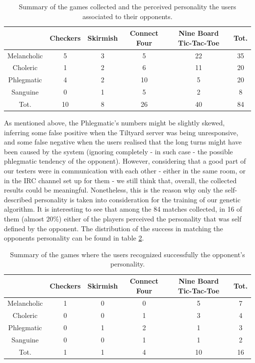 \begin{table}[h]
    \caption{Summary of the games collected and the perceived personality the users associated to their opponents.}
    \centering
    \scriptsize
	\begin{tabular}{|c|c|c|c|c||c|}
    	\hline
					& Checkers & Skirmish & Connect Four & Nine Board Tic-Tac-Toe & Tot. \\
        \hline
        Melancholic & 5  & 3 & 5  & 22 & 35 \\
        \hline
        Choleric	& 1  & 2 & 6  & 11  & 20 \\
        \hline
        Phlegmatic	& 4  & 2 & 10  & 5  & 20 \\
        \hline
        Sanguine	& 0  & 1 & 5 & 2  & 8 \\
        \hline \hline
        Tot.		& 10 & 8 & 26 & 40 & 84 \\
        \hline
	\end{tabular}
    \label{tab:datacpp}
\end{table}
As mentioned above, the Phlegmatic's numbers might be slightly skewed, inferring some false positive when the Tiltyard server was being unresponsive, and some false negative when the users realised that the long turns might have been caused by the system (ignoring completely - in such case - the possible phlegmatic tendency of the opponent). However, considering that a good part of our testers were in communication with each other - either in the same room, or in the IRC channel set up for them - we still think that, overall, the collected results could be meaningful. Nonetheless, this is the reason why only the self-described personality is taken into consideration for the training of our genetic algorithm.
It is interesting to see that among the 84 matches collected, in 16 of them (almost $20\%$) either of the players perceived the personality that was self defined by the opponent. The distribution of the success in matching the opponents personality can be found in table \ref{tab:matching}.
\begin{table}[h]
    \caption{Summary of the games where the users recognized successfully the opponent's personality.}
    \centering
    \scriptsize
	\begin{tabular}{|c|c|c|c|c||c|}
    	\hline
					& Checkers & Skirmish & Connect Four & Nine Board Tic-Tac-Toe & Tot. \\
        \hline
        Melancholic & 1 & 0 & 0 & 5  & 7 \\
        \hline
        Choleric	& 0 & 0 & 1 & 3  & 4 \\
        \hline
        Phlegmatic	& 0 & 1 & 2 & 1  & 3 \\
        \hline
        Sanguine	& 0 & 0 & 1 & 1  & 2 \\
        \hline \hline
        Tot.		& 1 & 1 & 4 & 10 & 16 \\
        \hline
	\end{tabular}
    \label{tab:matching}
\end{table}

